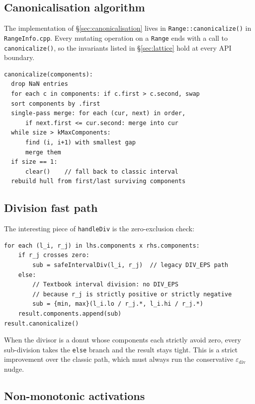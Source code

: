 \documentclass[11pt,a4paper]{article}
\theoremstyle{plain}
\begin{document}
\subsection{Canonicalisation algorithm}

The implementation of \S\ref{sec:canonicalisation} lives in
\texttt{Range::canonicalize()} in \texttt{RangeInfo.cpp}. Every
mutating operation on a \texttt{Range} ends with a call to
\texttt{canonicalize()}, so the invariants listed in
\S\ref{sec:lattice} hold at every API boundary.

\begin{lstlisting}[caption={Canonicalisation pseudocode.},label={lst:canon}]
canonicalize(components):
  drop NaN entries
  for each c in components: if c.first > c.second, swap
  sort components by .first
  single-pass merge: for each (cur, next) in order,
      if next.first <= cur.second: merge into cur
  while size > kMaxComponents:
      find (i, i+1) with smallest gap
      merge them
  if size == 1:
      clear()    // fall back to classic interval
  rebuild hull from first/last surviving components
\end{lstlisting}

\subsection{Division fast path}

The interesting piece of \texttt{handleDiv} is the zero-exclusion
check:

\begin{lstlisting}[caption={Zero-excluding division fast path.},label={lst:div}]
for each (l_i, r_j) in lhs.components x rhs.components:
    if r_j crosses zero:
        sub = safeIntervalDiv(l_i, r_j)  // legacy DIV_EPS path
    else:
        // Textbook interval division: no DIV_EPS
        // because r_j is strictly positive or strictly negative
        sub = {min, max}(l_i.lo / r_j.*, l_i.hi / r_j.*)
    result.components.append(sub)
result.canonicalize()
\end{lstlisting}

When the divisor is a donut whose components each strictly avoid zero,
every sub-division takes the \texttt{else} branch and the result stays
tight. This is a strict improvement over the classic path, which must
always run the conservative $\varepsilon_{\text{div}}$ nudge.

\subsection{Non-monotonic activations}
\end{document}
